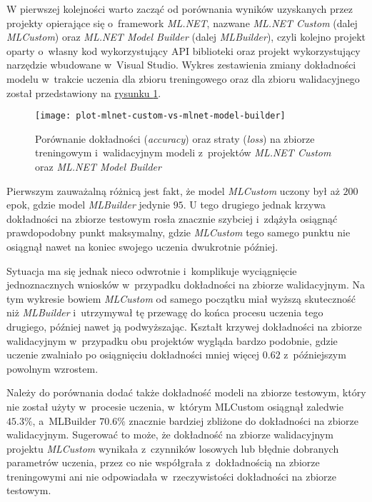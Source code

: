 W pierwszej kolejności warto zacząć od porównania wyników uzyskanych przez projekty opierające się o~framework \emph{ML.NET}, nazwane \emph{ML.NET Custom} (dalej \emph{MLCustom}) oraz \emph{ML.NET Model Builder} (dalej \emph{MLBuilder}), czyli kolejno projekt oparty o~własny kod wykorzystujący API biblioteki oraz projekt wykorzystujący narzędzie wbudowane w~Visual Studio.
Wykres zestawienia zmiany dokładności modelu w~trakcie uczenia dla zbioru treningowego oraz dla zbioru walidacyjnego został przedstawiony na \hyperref[fig:plot-mlnet-custom-vs-mlnet-model-builder]{rysunku \ref*{fig:plot-mlnet-custom-vs-mlnet-model-builder}}.

\begin{figure}[ht]
  \texttt{[image: plot-mlnet-custom-vs-mlnet-model-builder]}
  \caption[Porównanie dokładności oraz straty modeli ML.NET Custom oraz ML.NET Model Builder]{Porównanie dokładności (\emph{accuracy}) oraz straty (\emph{loss}) na zbiorze treningowym i~walidacyjnym modeli z~projektów \emph{ML.NET Custom} oraz \emph{ML.NET Model Builder}}
  \label{fig:plot-mlnet-custom-vs-mlnet-model-builder}
\end{figure}

Pierwszym zauważalną różnicą jest fakt, że model \emph{MLCustom} uczony był aż $200$ epok, gdzie model \emph{MLBuilder} jedynie $95$.
U tego drugiego jednak krzywa dokładności na zbiorze testowym rosła znacznie szybciej i~zdążyła osiągnąć prawdopodobny punkt maksymalny, gdzie \emph{MLCustom} tego samego punktu nie osiągnął nawet na koniec swojego uczenia dwukrotnie później.

Sytuacja ma się jednak nieco odwrotnie i~komplikuje wyciągnięcie jednoznacznych wniosków w~przypadku dokładności na zbiorze walidacyjnym.
Na tym wykresie bowiem \emph{MLCustom} od samego początku miał wyższą skuteczność niż \emph{MLBuilder} i~utrzymywał tę przewagę do końca procesu uczenia tego drugiego, później nawet ją podwyższając.
Kształt krzywej dokładności na zbiorze walidacyjnym w~przypadku obu projektów wygląda bardzo podobnie, gdzie uczenie zwalniało po osiągnięciu dokładności mniej więcej $0.62$ z~późniejszym powolnym wzrostem.

Należy do porównania dodać także dokładność modeli na zbiorze testowym, który nie został użyty w~procesie uczenia, w~którym MLCustom osiągnął zaledwie $45.3\%$, a~MLBuilder $70.6\%$ znacznie bardziej zbliżone do dokładności na zbiorze walidacyjnym.
Sugerować to może, że dokładność na zbiorze walidacyjnym projektu \emph{MLCustom} wynikała z~czynników losowych lub błędnie dobranych parametrów uczenia, przez co nie współgrała z~dokładnością na zbiorze treningowymi ani nie odpowiadała w~rzeczywistości dokładności na zbiorze testowym.

